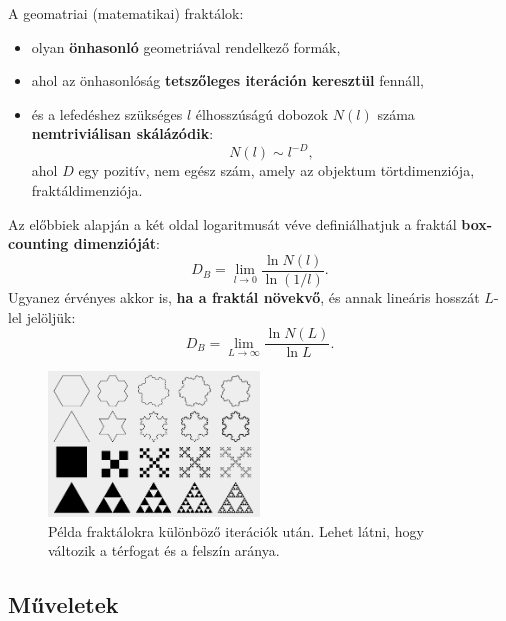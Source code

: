 \documentclass[12pt]{article}
\theoremstyle{plain}
\begin{document}
A geomatriai (matematikai) fraktálok:
\begin{itemize}
	\item olyan \textbf{önhasonló} geometriával rendelkező formák,
	\item ahol az önhasonlóság \textbf{tetszőleges iteráción keresztül} fennáll, 
	\item és a lefedéshez szükséges $l$ élhosszúságú dobozok $N \left( l \right) $ száma \textbf{nemtriviálisan skálázódik}:
		\begin{equation}
					N \left( l \right) \sim l^{-D},
		\end{equation}
	ahol $D$ egy pozitív, nem egész szám, amely az objektum törtdimenziója, fraktáldimenziója.
\end{itemize}

Az előbbiek alapján a két oldal logaritmusát véve definiálhatjuk a fraktál \textbf{box-counting dimenzióját}:
\begin{equation}
D_B = \lim_{l \rightarrow 0 } \frac{\ln N \left( l\right) }{\ln \left(1/l\right)}.
\end{equation}
Ugyanez érvényes akkor is, \textbf{ha a fraktál növekvő}, és annak lineáris hosszát $L$-lel jelöljük:
\begin{equation}
D_B = \lim_{L \rightarrow \infty } \frac{\ln N \left( L\right) }{\ln L}.
\end{equation}



\begin{figure}[H]
    \begin{center}
    \includegraphics[width=0.5\textwidth]{media/fractal_pelda.png}
    \caption{Példa fraktálokra különböző iterációk után. Lehet látni, hogy változik a térfogat és a felszín aránya. } 
    \label{fig:fractal_peldak}
    \end{center}
\end{figure}

\subsection{Műveletek}
\end{document}
